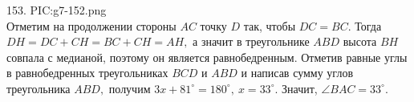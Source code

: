 153. {{PIC:g7-152.png}}\\
Отметим на продолжении стороны $AC$ точку $D$ так, чтобы $DC=BC.$ Тогда $DH=DC+CH=BC+CH=AH,$ а значит в треугольнике $ABD$ высота $BH$ совпала с медианой, поэтому он является равнобедренным. Отметив равные углы в равнобедренных треугольниках $BCD$ и $ABD$ и написав сумму углов треугольника $ABD,$ получим $3x+81^\circ=180^\circ,\ x=33^\circ.$ Значит, $\angle BAC=33^\circ.$\\
